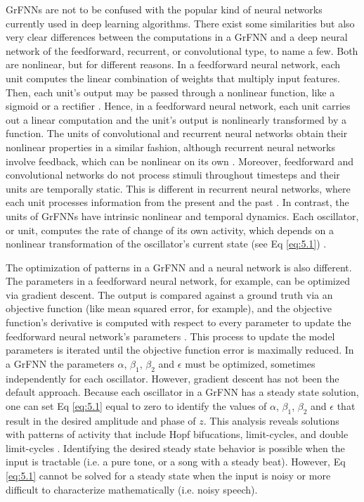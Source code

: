 \documentclass{report}
\begin{document}
GrFNNs are not to be confused with the popular kind of neural networks currently used in deep learning algorithms. There exist some similarities but also very clear differences between the computations in a GrFNN and a deep neural network of the feedforward, recurrent, or convolutional type, to name a few. Both are nonlinear, but for different reasons. In a feedforward neural network, each unit computes the linear combination of weights that multiply input features. Then, each unit's output may be passed through a nonlinear function, like a sigmoid or a rectifier \cite{svozil1997introduction}. Hence, in a feedforward neural network, each unit carries out a linear computation and the unit's output is nonlinearly transformed by a function. The units of convolutional and recurrent neural networks obtain their nonlinear properties in a similar fashion, although recurrent neural networks involve feedback, which can be nonlinear on its own \cite{le2015tutorial2}. Moreover, feedforward and convolutional networks do not process stimuli throughout timesteps and their units are temporally static. This is different in recurrent neural networks, where each unit processes information from the present and the past \cite{le2015tutorial2}. In contrast, the units of GrFNNs have intrinsic nonlinear and temporal dynamics. Each oscillator, or unit, computes the rate of change of its own activity, which depends on a nonlinear transformation of the oscillator's current state (see Eq \eqref{eq:5.1}) \cite{large2010canonical}. 

The optimization of patterns in a GrFNN and a neural network is also different. The parameters in a feedforward neural network, for example, can be optimized via gradient descent. The output is compared against a ground truth via an objective function (like mean squared error, for example), and the objective function's derivative is computed with respect to every parameter to update the feedforward neural network's parameters \cite{le2015tutorial1}. This process to update the model parameters is iterated until the objective function error is maximally reduced. In a GrFNN the parameters $\alpha$, $\beta_1$, $\beta_2$ and $\epsilon$ must be optimized, sometimes independently for each oscillator. However, gradient descent has not been the default approach. Because each oscillator in a GrFNN has a steady state solution, one can set Eq \eqref{eq:5.1} equal to zero to identify the values of $\alpha$, $\beta_1$, $\beta_2$ and $\epsilon$ that result in the desired amplitude and phase of $z$. This analysis reveals solutions with patterns of activity that include Hopf bifucations, limit-cycles, and double limit-cycles \cite{kim2015signal}. Identifying the desired steady state behavior is possible when the input is tractable (i.e. a pure tone, or a song with a steady beat). However, Eq \eqref{eq:5.1} cannot be solved for a steady state when the input is noisy or more difficult to characterize mathematically (i.e. noisy speech). 
\end{document}

